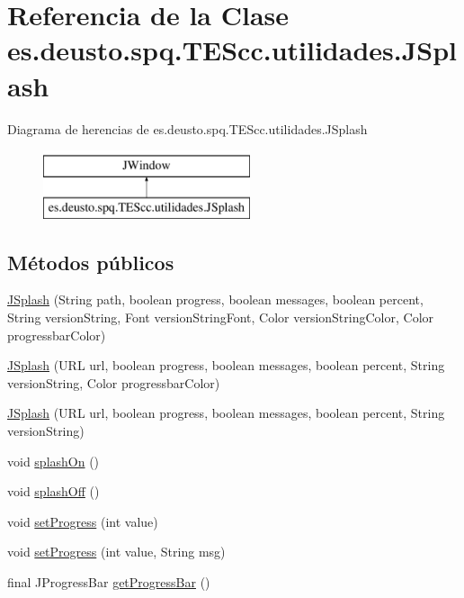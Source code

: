 \hypertarget{classes_1_1deusto_1_1spq_1_1_t_e_scc_1_1utilidades_1_1_j_splash}{\section{Referencia de la Clase es.\+deusto.\+spq.\+T\+E\+Scc.\+utilidades.\+J\+Splash}
\label{classes_1_1deusto_1_1spq_1_1_t_e_scc_1_1utilidades_1_1_j_splash}
}
Diagrama de herencias de es.\+deusto.\+spq.\+T\+E\+Scc.\+utilidades.\+J\+Splash\begin{figure}[H]
\begin{center}
\leavevmode
\includegraphics[height=2.000000cm]{classes_1_1deusto_1_1spq_1_1_t_e_scc_1_1utilidades_1_1_j_splash}
\end{center}
\end{figure}
\subsection*{Métodos públicos}
\begin{DoxyCompactItemize}
\item 
\hyperlink{classes_1_1deusto_1_1spq_1_1_t_e_scc_1_1utilidades_1_1_j_splash_af3050873f091dfd1c1306c332812ce4e}{J\+Splash} (String path, boolean progress, boolean messages, boolean percent, String version\+String, Font version\+String\+Font, Color version\+String\+Color, Color progressbar\+Color)
\item 
\hyperlink{classes_1_1deusto_1_1spq_1_1_t_e_scc_1_1utilidades_1_1_j_splash_a75bb6f1ba67899fb8992c261cc89358b}{J\+Splash} (U\+R\+L url, boolean progress, boolean messages, boolean percent, String version\+String, Color progressbar\+Color)
\item 
\hyperlink{classes_1_1deusto_1_1spq_1_1_t_e_scc_1_1utilidades_1_1_j_splash_afcb9d6d1f96eb2fbc3980f40c26ba30c}{J\+Splash} (U\+R\+L url, boolean progress, boolean messages, boolean percent, String version\+String)
\item 
void \hyperlink{classes_1_1deusto_1_1spq_1_1_t_e_scc_1_1utilidades_1_1_j_splash_a842d3e2a568100c98aebe25e448730cf}{splash\+On} ()
\item 
void \hyperlink{classes_1_1deusto_1_1spq_1_1_t_e_scc_1_1utilidades_1_1_j_splash_af4ce0ceefcee6b25e2176e9ca1d78e72}{splash\+Off} ()
\item 
void \hyperlink{classes_1_1deusto_1_1spq_1_1_t_e_scc_1_1utilidades_1_1_j_splash_a79c62ed62dfb40dce9d7bc93455183d5}{set\+Progress} (int value)
\item 
void \hyperlink{classes_1_1deusto_1_1spq_1_1_t_e_scc_1_1utilidades_1_1_j_splash_a7e1d66ba57cadf54e9854bf409d85d96}{set\+Progress} (int value, String msg)
\item 
final J\+Progress\+Bar \hyperlink{classes_1_1deusto_1_1spq_1_1_t_e_scc_1_1utilidades_1_1_j_splash_a338fead705721ef51eb0875de43b7379}{get\+Progress\+Bar} ()
\end{DoxyCompactItemize}


